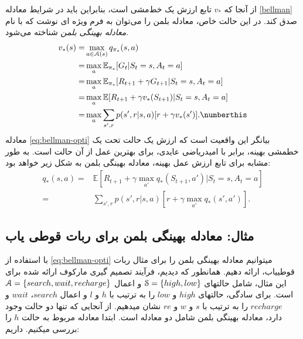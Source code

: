 از آنجا که $v_*$ تابع ارزش یک خط‌مشی است، بنابراین باید در شرایط معادله \ref{bellman} صدق کند.
در این حالت خاص، معادله بلمن را می‌توان به فرم ویژه ای نوشت که با نام
 \textit{معادله بهینگی بلمن}
شناخته می‌شود.
\begin{align}
  v_{*}(s)= &\max_{a \in \EuScript{A}(s)} q_{\pi_*}(s,a) \nonumber \\
      =& \max_{a} \mathbb{E}_{\pi_*} [G_t|S_t=s, A_t=a] \nonumber \\ 
      =& \max_{a} \mathbb{E}_{\pi_*} [R_{t+1} + \gamma G_{t+1} | S_t=s, A_t=a] \nonumber \\ 
      =& \max_{a} \mathbb{E} [R_{t+1} + \gamma v_*(S_{t+1}) | S_t= s, A_t = a] \nonumber \\
      =& \max_{a} \sum_{s',r} p(s',r|s,a) [r + \gamma v_*(s')]. \numberthis
\label{eq:bellman-opti}
\end{align}
معادله 
\ref{eq:bellman-opti}
 بیانگر این واقعیت است که ارزش یک حالت تحت یک خط\nf مشی بهینه، برابر با امیدریاضی عایدی، برای بهترین عمل از آن حالت است. به طور مشابه برای تابع ارزش عمل بهینه، معادله بهینگی بلمن به شکل زیر خواهد بود:
\begin{align}
q_*(s,a) =& \mathbb{E}\left[R_{t+1} + \gamma \max_{a'} q_*(S_{t+1},a')| S_t=s, A_t=a \right] \nonumber\\
=& \sum_{s',r} p(s',r|s,a) \left[r + \gamma \max_{a'} q_*(s',a')\right] 
\label{eq:2}.
\end{align}

\subsection{مثال: معادله بهینگی بلمن برای ربات قوطی یاب}
با استفاده از 
\ref{eq:bellman-opti}
می\nf توانیم معادله بهینگی بلمن را برای مثال ربات قوطی\nf یاب، ارائه دهیم. همانطور که دیدیم، فرآیند تصمیم گیری مارکوف ارائه شده برای این مثال، شامل حالت\nf های 
$\EuScript{S} = \{high, low\}$
و اعمال 
$\EuScript{A} = \{search, wait, recharge\}$
است.
برای سادگی، حالت\nf های $high$ و $low$ را به ترتیب با $h$ و $l$ و اعمال $search$،
$wait$
و
$recharge$
را به ترتیب با $s$ و $w$ و $re$ نشان می\nf دهیم. از آنجایی که تنها دو حالت وجود دارد، معادله بهینگی بلمن شامل دو معادله است. ابتدا معادله مربوط به حالت $h$ را بررسی می\nf کنیم. داریم:

